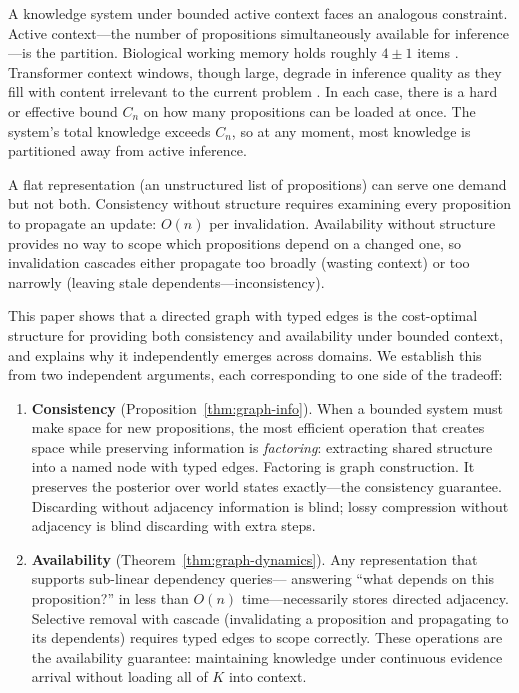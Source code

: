 \documentclass[11pt]{article}
\theoremstyle{definition}
\begin{document}
A knowledge system under bounded active context faces an analogous
constraint. Active context---the number of propositions simultaneously
available for inference---is the partition. Biological working memory holds
roughly $4 \pm 1$ items \cite{Cowan2001}. Transformer context windows,
though large, degrade in inference quality as they fill with content
irrelevant to the current problem \cite{Liu2024}. In each case,
there is a hard or effective bound $C_n$ on how many propositions can
be loaded at once. The system's total knowledge exceeds $C_n$, so at
any moment, most knowledge is partitioned away from active inference.

A flat representation (an unstructured list of propositions) can
serve one demand but not both. Consistency without structure requires
examining every proposition to propagate an update: $O(n)$ per
invalidation. Availability without structure provides no way to scope
which propositions depend on a changed one, so invalidation cascades
either propagate too broadly (wasting context) or too narrowly
(leaving stale dependents---inconsistency).

This paper shows that a directed graph with typed edges is the
cost-optimal structure for providing both consistency and availability
under bounded context, and explains why it independently emerges
across domains. We establish this from two independent
arguments, each corresponding to one side of the tradeoff:

\begin{enumerate}
\item \textbf{Consistency} (Proposition~\ref{thm:graph-info}).
   When a bounded system must make space for new propositions, the most efficient
   operation that creates space while preserving information is
   \emph{factoring}: extracting shared structure into a named node with
   typed edges. Factoring is graph construction. It preserves the
   posterior over world states exactly---the consistency guarantee.
   Discarding without adjacency information is blind; lossy compression
   without adjacency is blind discarding with extra steps.

\item \textbf{Availability} (Theorem~\ref{thm:graph-dynamics}).
   Any representation that supports sub-linear dependency queries---
   answering ``what depends on this proposition?'' in less than $O(n)$
   time---necessarily stores directed adjacency. Selective removal
   with cascade (invalidating a proposition and propagating to its
   dependents) requires typed edges to scope correctly. These
   operations are the availability guarantee: maintaining knowledge
   under continuous evidence arrival without loading all of $K$ into
   context.
\end{enumerate}
\end{document}
